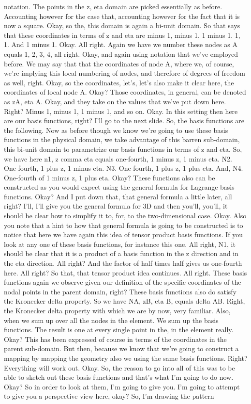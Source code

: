 \documentclass[10pt]{article}
\begin{document}
notation. The points in the z, eta domain are picked essentially as before. Accounting however for the case that, accounting however for the fact that it is now a square. Okay, so the, this domain is again a bi-unit domain. So that says that these coordinates in terms of z and eta are minus 1, minus 1, 1 minus 1. 1, 1. And 1 minus 1. Okay. All right. Again we have we number these nodes as A equals 1, 2, 3, 4, all right. Okay, and again using notation that we've employed before. We may say that that the coordinates of node A, where we, of course, we're implying this local numbering of nodes, and therefore of degrees of freedom as well, right. Okay, so the coordinates, let's, let's also make it clear here, the coordinates of local node A. Okay? Those coordinates, in general, can be denoted as zA, eta A. Okay, and they take on the values that we've put down here. Right? Minus 1, minus 1, 1 minus 1, and so on. Okay. In this setting then here are our basis functions, right? I'll go to the next slide. So, the basis functions are the following. Now as before though we know we're going to use these basis functions in the physical domain, we take advantage of this barren sub-domain, this bi-unit domain to parametrize our basis functions in terms of z and eta. So, we have here n1, z comma eta equals one-fourth, 1 minus z, 1 minus eta. N2. One-fourth, 1 plus z, 1 minus eta. N3. One-fourth, 1 plus z, 1 plus eta. And, N4. One-fourth of 1 minus z, 1 plus eta. Okay? These functions also can be constructed as you would expect using the general formula for Lagrange basis functions. Okay? And I put down that, that general formula a little later, all right? I'll, I'll give you the general formula for 3D and then you'll, you'll, it should be clear how to simplify it to, for, to the two-dimensional case. Okay. Also you note that a hint to how that general formula is going to be constructed is to notice that here we have again this idea of tensor product basis functions. If you look at any one of these basis functions, for instance this one. All right, N1, it should be clear that it is a product of a basis function in the z direction and in the eta direction. All right? And the factor of half times half gives us one-fourth here. All right? So that, that tensor product idea continues. All right. These basis functions again we observe given our definition of the specific coordinates of the nodal points in the parent domain, right? These basis functions also do satisfy the Kronecker delta property. So we have NA, zB, eta B, equals delta AB. Right, the Kronecker delta property with which we are by now, very familiar. Also, when we sum up over all the nodes in the element. We sum up the basis functions. The result is one at every single point in the, in the element really. Okay? This has been expressed of course in terms of the coordinates in the parent sub-domain. But then, because we know that we're going to construct a mapping by mapping the geometry also we using the same basis functions. Right? Everything will work out. Okay. So, the reason to go into all of this was to be able to sketch out these basis functions and that's what I'm going to do now. Okay? So in order to look at them, I'm going to give you. I'm going to attempt to give you a perspective view here, okay? So, I'm drawing the pattern 
\end{document}
